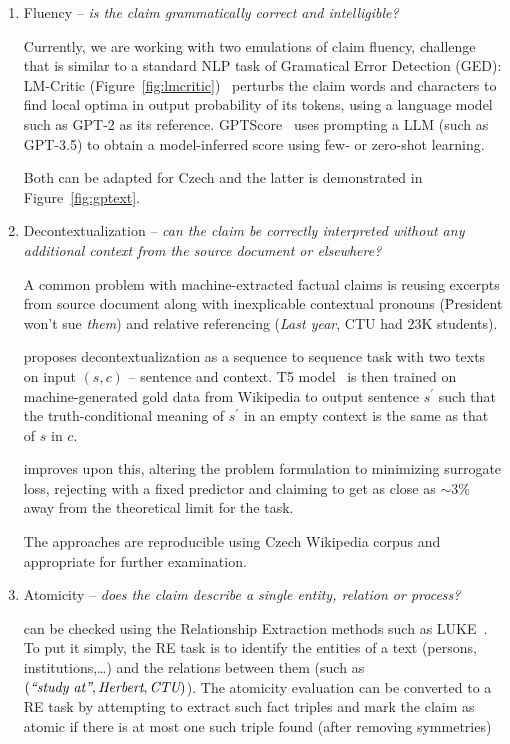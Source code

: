 \begin{enumerate}
    \item {\techbf Fluency} -- \textit{is the claim grammatically correct and intelligible?}
    
    Currently, we are working with two emulations of claim fluency, challenge that is similar to a standard NLP task of Gramatical Error Detection (GED): \textsf{LM-Critic} (Figure~\ref{fig:lmcritic})~\cite{yasunaga-etal-2021-lm} perturbs the claim words and characters to find local optima in output probability of its tokens, using a language model such as GPT-2 as its reference. \textsf{GPTScore}~\cite{fu2023gptscore} uses prompting a LLM (such as GPT-3.5) to obtain a model-inferred score using few- or zero-shot learning.
    
    Both can be adapted for Czech and the latter is demonstrated in Figure~\ref{fig:gptext}.
    \item {\techbf Decontextualization} -- \textit{can the claim be correctly interpreted without any additional context from the source document or elsewhere?}
    
    A common problem with machine-extracted factual claims is reusing excerpts from source document along with inexplicable contextual pronouns (\"{President won't sue \textit{them}}) and relative referencing (\"{\textit{Last year}, CTU had 23K students}).

\cite{choi-etal-2021-decontextualization} proposes decontextualization as a sequence to sequence task with two texts on input $(s,c)$ -- sentence and context.
    T5 model~\cite{t5-11b} is then trained on machine-generated gold data from Wikipedia to output sentence $s^\prime$ such that the truth-conditional meaning of $s^\prime$ in an empty context is the same as that of $s$ in $c$.

    \cite{mohri2023learning} improves upon this, altering the problem formulation to minimizing surrogate loss, rejecting with a fixed predictor and claiming to get as close as $\sim3\%$ away from the theoretical limit for the task.

    The approaches are reproducible using Czech Wikipedia corpus and appropriate for further examination.

    \item {\techbf Atomicity} --  \textit{does the claim describe a single entity, relation or process?}
    
    can be checked using the Relationship Extraction methods such as LUKE~\cite{yamada2020luke}. To put it simply, the RE task is to identify the entities of a text (persons, institutions,\dots) and the relations between them (such as $(\textit{\"{study at}}, \textit{Herbert}, \textit{CTU})$). The atomicity evaluation can be converted to a RE task by attempting to extract such fact triples and mark the claim as atomic if there is at most one such triple found (after removing symmetries)


\end{enumerate}

